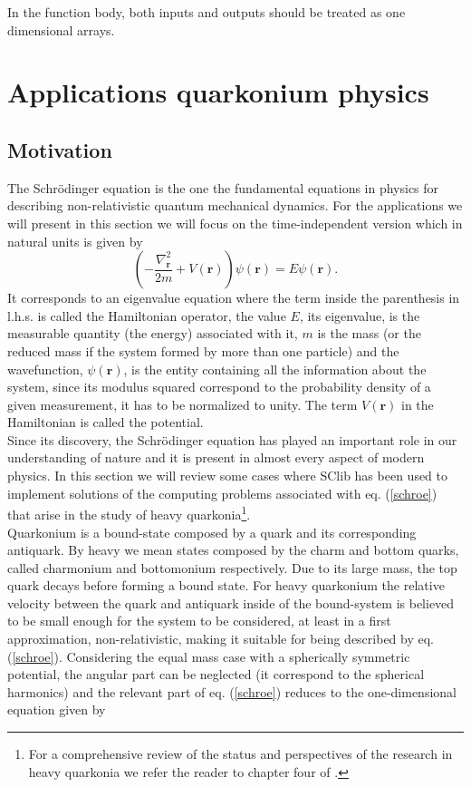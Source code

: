 \documentclass[10pt, a4paper, twocolumn]{article}
\begin{document}
In the function body, both inputs and outputs should be treated as one
dimensional arrays.

\section{Applications quarkonium physics}
\subsection{Motivation}
The Schr\"odinger equation is the one the fundamental equations in physics for describing non-relativistic quantum mechanical dynamics. For the applications we will present in this section we will focus on the time-independent version which in natural units is given by
\begin{equation}\label{schroe}
    \left(-\frac{\nabla_{\mathbf r}^2}{2m}+V(\mathbf{r})\right)\psi(\mathbf{r}) = E\psi(\mathbf{r}).
\end{equation} It corresponds to an eigenvalue equation where the term inside the parenthesis in l.h.s. is called the Hamiltonian operator, the value $E$, its eigenvalue, is the measurable quantity (the energy) associated with it, $m$ is the mass (or the reduced mass if the system formed by more than one particle) and the wavefunction, $\psi(\mathbf{r})$, is the entity containing all the information about the system, since its modulus squared correspond to the probability density of a given measurement, it has to be normalized to unity. The term $V({\mathbf r})$ in the Hamiltonian is called the potential.\\
Since its discovery, the Schr\"odinger equation has played an important role in our understanding of nature and it is present in almost every aspect of modern physics. In this section we will review some cases where SClib has been used to implement solutions of the computing problems associated with eq. (\ref{schroe}) that arise in the study of heavy quarkonia\footnote{For a comprehensive review of the status and perspectives of the research in heavy quarkonia we refer the reader to chapter four of \cite{Brambilla:2014jmp}.}.
\\
Quarkonium is a bound-state composed by a quark and its corresponding antiquark. By heavy we mean states composed by the charm and bottom quarks, called charmonium and bottomonium respectively. Due to its large mass, the top quark decays before forming a bound state. For heavy quarkonium the relative velocity between the quark and antiquark inside of the bound-system is believed to be small enough for the system to be considered, at least in a first approximation, non-relativistic, making it suitable for being described by eq. (\ref{schroe}). Considering the equal mass case with a spherically symmetric potential, the angular part can be neglected (it correspond to the spherical harmonics) and the relevant part of eq. (\ref{schroe}) reduces to the one-dimensional equation given by
\end{document}
